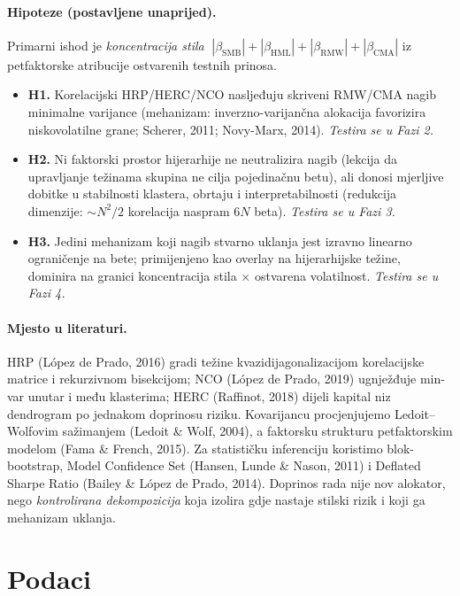 \documentclass[11pt]{article}
\begin{document}
\paragraph{Hipoteze (postavljene unaprijed).} Primarni ishod je
\emph{koncentracija stila}
$\;|\beta_{\text{SMB}}| + |\beta_{\text{HML}}| + |\beta_{\text{RMW}}| + |\beta_{\text{CMA}}|$
iz petfaktorske atribucije ostvarenih testnih prinosa.

\begin{itemize}
  \item \textbf{H1.} Korelacijski HRP/HERC/NCO nasljeđuju skriveni RMW/CMA nagib
        minimalne varijance (mehanizam: inverzno-varijančna alokacija favorizira
        niskovolatilne grane; Scherer, 2011; Novy-Marx, 2014). \emph{Testira se u
        Fazi 2.}
  \item \textbf{H2.} Ni faktorski prostor hijerarhije ne neutralizira nagib
        (lekcija da upravljanje težinama skupina ne cilja pojedinačnu betu), ali
        donosi mjerljive dobitke u stabilnosti klastera, obrtaju i
        interpretabilnosti (redukcija dimenzije: $\sim N^2/2$ korelacija naspram
        $6N$ beta). \emph{Testira se u Fazi 3.}
  \item \textbf{H3.} Jedini mehanizam koji nagib stvarno uklanja jest izravno
        linearno ograničenje na bete; primijenjeno kao overlay na hijerarhijske
        težine, dominira na granici koncentracija stila $\times$ ostvarena
        volatilnost. \emph{Testira se u Fazi 4.}
\end{itemize}

\paragraph{Mjesto u literaturi.} HRP (López de Prado, 2016) gradi težine
kvazidijagonalizacijom korelacijske matrice i rekurzivnom bisekcijom; NCO (López
de Prado, 2019) ugnježđuje min-var unutar i među klasterima; HERC (Raffinot,
2018) dijeli kapital niz dendrogram po jednakom doprinosu riziku. Kovarijancu
procjenjujemo Ledoit--Wolfovim sažimanjem (Ledoit \& Wolf, 2004), a faktorsku
strukturu petfaktorskim modelom (Fama \& French, 2015). Za statističku
inferenciju koristimo blok-bootstrap, Model Confidence Set (Hansen, Lunde \&
Nason, 2011) i Deflated Sharpe Ratio (Bailey \& López de Prado, 2014). Doprinos
rada nije nov alokator, nego \emph{kontrolirana dekompozicija} koja izolira gdje
nastaje stilski rizik i koji ga mehanizam uklanja.

\section{Podaci}
\end{document}
